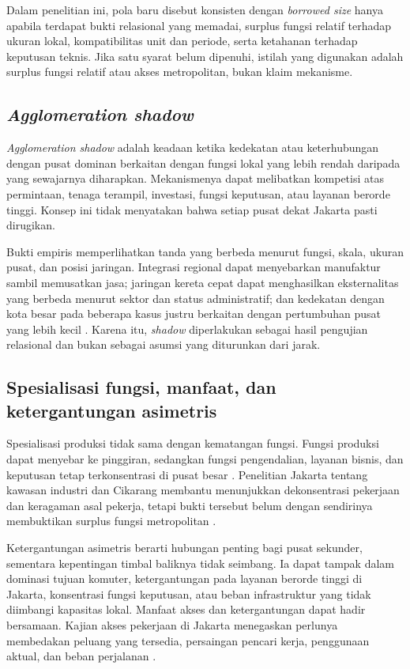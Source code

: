 \documentclass[11pt,a4paper,oneside,openany,indonesian]{report}
\begin{document}
Dalam penelitian ini, pola baru disebut konsisten dengan \textit{borrowed size} hanya apabila terdapat bukti relasional yang memadai, surplus fungsi relatif terhadap ukuran lokal, kompatibilitas unit dan periode, serta ketahanan terhadap keputusan teknis. Jika satu syarat belum dipenuhi, istilah yang digunakan adalah surplus fungsi relatif atau akses metropolitan, bukan klaim mekanisme.

\subsection{\textit{Agglomeration shadow}}

\textit{Agglomeration shadow} adalah keadaan ketika kedekatan atau keterhubungan dengan pusat dominan berkaitan dengan fungsi lokal yang lebih rendah daripada yang sewajarnya diharapkan. Mekanismenya dapat melibatkan kompetisi atas permintaan, tenaga terampil, investasi, fungsi keputusan, atau layanan berorde tinggi. Konsep ini tidak menyatakan bahwa setiap pusat dekat Jakarta pasti dirugikan.

Bukti empiris memperlihatkan tanda yang berbeda menurut fungsi, skala, ukuran pusat, dan posisi jaringan. Integrasi regional dapat menyebarkan manufaktur sambil memusatkan jasa; jaringan kereta cepat dapat menghasilkan eksternalitas yang berbeda menurut sektor dan status administratif; dan kedekatan dengan kota besar pada beberapa kasus justru berkaitan dengan pertumbuhan pusat yang lebih kecil \parencite{zhenshilu2023,shietal2025,partridgeetal2009,sunding2016}. Karena itu, \textit{shadow} diperlakukan sebagai hasil pengujian relasional dan bukan sebagai asumsi yang diturunkan dari jarak.

\subsection{Spesialisasi fungsi, manfaat, dan ketergantungan asimetris}

Spesialisasi produksi tidak sama dengan kematangan fungsi. Fungsi produksi dapat menyebar ke pinggiran, sedangkan fungsi pengendalian, layanan bisnis, dan keputusan tetap terkonsentrasi di pusat besar \parencite{durantonpuga2005}. Penelitian Jakarta tentang kawasan industri dan Cikarang membantu menunjukkan dekonsentrasi pekerjaan dan keragaman asal pekerja, tetapi bukti tersebut belum dengan sendirinya membuktikan surplus fungsi metropolitan \parencite{hudalahetal2013,permatasarihudalah2013}.

Ketergantungan asimetris berarti hubungan penting bagi pusat sekunder, sementara kepentingan timbal baliknya tidak seimbang. Ia dapat tampak dalam dominasi tujuan komuter, ketergantungan pada layanan berorde tinggi di Jakarta, konsentrasi fungsi keputusan, atau beban infrastruktur yang tidak diimbangi kapasitas lokal. Manfaat akses dan ketergantungan dapat hadir bersamaan. Kajian akses pekerjaan di Jakarta menegaskan perlunya membedakan peluang yang tersedia, persaingan pencari kerja, penggunaan aktual, dan beban perjalanan \parencite{andani2021,aritenang2022,andani2025}.
\end{document}
